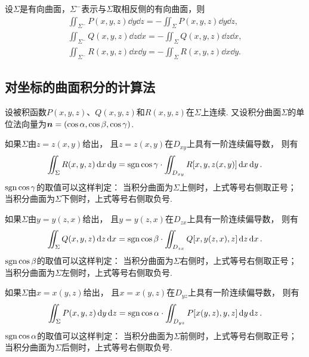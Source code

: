 \begin{property}
设\(\Sigma\)是有向曲面，\(\Sigma^-\)表示与\(\Sigma\)取相反侧的有向曲面，则\begin{gather*}
\iint_{\Sigma^-} P(x,y,z) \dd{y}\dd{z} = -\iint_\Sigma P(x,y,z) \dd{y}\dd{z}, \\
\iint_{\Sigma^-} Q(x,y,z) \dd{z}\dd{x} = -\iint_\Sigma Q(x,y,z) \dd{z}\dd{x}, \\
\iint_{\Sigma^-} R(x,y,z) \dd{x}\dd{y} = -\iint_\Sigma R(x,y,z) \dd{x}\dd{y}.
\end{gather*}
\end{property}

\subsection{对坐标的曲面积分的计算法}
\begin{theorem}
设被积函数\(P(x,y,z)\)、\(Q(x,y,z)\)和\(R(x,y,z)\)在\(\Sigma\)上连续.
又设积分曲面\(\Sigma\)的单位法向量为\(\boldsymbol{n} = (\cos\alpha,\cos\beta,\cos\gamma)\).

如果\(\Sigma\)由\(z=z(x,y)\)给出，
且\(z=z(x,y)\)在\(D_{xy}\)上具有一阶连续偏导数，
则有\begin{equation}\label{equation:线积分与面积分.第二类曲面积分的计算式1}
	\iint_\Sigma R(x,y,z) \dd{x}\dd{y}
	= \operatorname{sgn}\cos\gamma \cdot \iint_{D_{xy}} R[x,y,z(x,y)] \dd{x}\dd{y}.
\end{equation}
\(\operatorname{sgn}\cos\gamma\)的取值可以这样判定：
当积分曲面为\(\Sigma\)上侧时，上式等号右侧取正号；
当积分曲面为\(\Sigma\)下侧时，上式等号右侧取负号.

如果\(\Sigma\)由\(y=y(z,x)\)给出，
且\(y=y(z,x)\)在\(D_{zx}\)上具有一阶连续偏导数，
则有\begin{equation}\label{equation:线积分与面积分.第二类曲面积分的计算式2}
	\iint_\Sigma Q(x,y,z) \dd{z}\dd{x}
	= \operatorname{sgn}\cos\beta \cdot \iint_{D_{zx}} Q[x,y(z,x),z] \dd{z}\dd{x}.
\end{equation}
\(\operatorname{sgn}\cos\beta\)的取值可以这样判定：
当积分曲面为\(\Sigma\)右侧时，上式等号右侧取正号；
当积分曲面为\(\Sigma\)左侧时，上式等号右侧取负号.

如果\(\Sigma\)由\(x=x(y,z)\)给出，
且\(x=x(y,z)\)在\(D_{yz}\)上具有一阶连续偏导数，
则有\begin{equation}\label{equation:线积分与面积分.第二类曲面积分的计算式3}
	\iint_\Sigma P(x,y,z) \dd{y}\dd{z}
	= \operatorname{sgn}\cos\alpha \cdot \iint_{D_{yz}} P[x(y,z),y,z] \dd{y}\dd{z}.
\end{equation}
\(\operatorname{sgn}\cos\alpha\)的取值可以这样判定：
当积分曲面为\(\Sigma\)前侧时，上式等号右侧取正号；
当积分曲面为\(\Sigma\)后侧时，上式等号右侧取负号.
\end{theorem}

